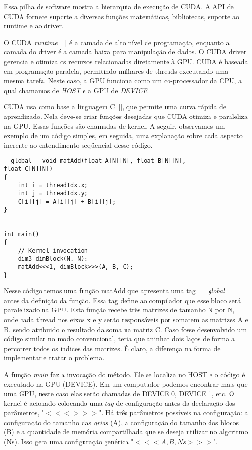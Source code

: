 Essa pilha de software mostra a hierarquia de execução de CUDA. A API de CUDA fornece suporte a diversas funções matemáticas, bibliotecas, suporte ao runtime e ao driver.

O CUDA \textit{runtime} ~[\cite{cuda}] é a camada de alto nível de programação, enquanto a camada do driver é a camada baixa para manipulação de dados. O CUDA driver gerencia e otimiza os recursos relacionados diretamente à GPU. CUDA é baseada em programação paralela, permitindo milhares de threads executando uma mesma tarefa. Neste caso, a GPU funciona como um co-processador da CPU, a qual chamamos de \textit{HOST} e a GPU de \textit{DEVICE}.

CUDA usa como base a linguagem C~[\cite{cuda}], que permite uma curva rápida de aprendizado. Nela deve-se criar funções desejadas que CUDA otimiza e paraleliza na GPU. Essas funções são chamadas de kernel. A seguir, observamos um exemplo de um código simples, em seguida, uma explanação sobre cada aspecto inerente ao entendimento seqüencial desse código.


\begin{verbatim}
__global__ void matAdd(float A[N][N], float B[N][N],
float C[N][N])
{
    int i = threadIdx.x;
    int j = threadIdx.y;
    C[i][j] = A[i][j] + B[i][j];
}


int main()
{
    // Kernel invocation
    dim3 dimBlock(N, N);
    matAdd<<<1, dimBlock>>>(A, B, C);
}

\end{verbatim}

Nesse código temos uma função matAdd que apresenta uma tag \textit{\_\_global\_\_} antes da definição da função. Essa tag define ao compilador que esse bloco será paralelizado na GPU.  Esta função recebe três matrizes de tamanho N por N, onde cada thread nos eixos x e y serão responsáveis por somarem as matrizes A e B, sendo atribuido o resultado da soma na matriz C.  Caso fosse desenvolvido um código similar no modo convencional, teria que aninhar dois laços de forma a percorrer todos os indices das matrizes. É claro, a diferença na forma de implementar e tratar o problema.

A função \textit{main} faz a invocação do método. Ele se localiza no HOST e o código é executado na GPU (DEVICE). Em um computador podemos encontrar mais que uma GPU, neste caso elas serão chamadas de DEVICE 0, DEVICE 1, etc. O kernel é acionado colocando uma \textit{tag} de configuração antes da declaração dos parâmetros, "$<<< >>>$". Há três parâmetros possíveis na configuração: a configuração do tamanho das \textit{grids} (A), a configuração do tamanho dos blocos (B) e a quantidade de memória compartilhada que se deseja utilizar no algoritmo (Ns). Isso gera uma configuração genérica "$<<<A,B,Ns >>>$".

